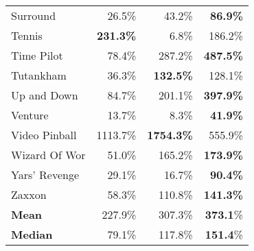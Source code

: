 \begin{table}[h!]
\begin{center}
\begin{tabular}{l|rrr}
           Surround  &    26.5\% &    43.2\% &{\bf86.9\%}\\
              Tennis &{\bf231.3\%}&     6.8\% &   186.2\% \\
          Time Pilot &    78.4\% &   287.2\% &{\bf487.5\%}\\
           Tutankham &    36.3\% &{\bf132.5\%}&   128.1\% \\
         Up and Down &    84.7\% &   201.1\% &{\bf397.9\%}\\
             Venture &    13.7\% &     8.3\% &{\bf41.9\%}\\
       Video Pinball &  1113.7\% &{\bf1754.3\%}&   555.9\% \\
       Wizard Of Wor &    51.0\% &   165.2\% &{\bf173.9\%}\\
       Yars' Revenge &    29.1\% &    16.7\% &{\bf90.4\%}\\
              Zaxxon &    58.3\% &   110.8\% &{\bf141.3\%}\\
            \hline
            {\bf Mean}   &    227.9\% & 307.3\% &  {\bf373.1}\% \\
            {\bf Median}   &79.1\% & 117.8\% & {\bf151.4}\% \\
\end{tabular}
\end{center}
\end{table}


